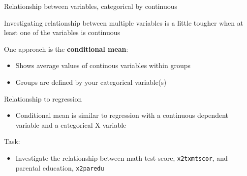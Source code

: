\documentclass[8pt,ignorenonframetext,dvipsnames]{beamer}
\newenvironment{Shaded}{\begin{snugshade}}{\end{snugshade}}
\newcommand{\KeywordTok}[1]{\textcolor[rgb]{0.13,0.29,0.53}{\textbf{#1}}}
\newcommand{\DataTypeTok}[1]{\textcolor[rgb]{0.13,0.29,0.53}{#1}}
\newcommand{\StringTok}[1]{\textcolor[rgb]{0.31,0.60,0.02}{#1}}
\newcommand{\CommentTok}[1]{\textcolor[rgb]{0.56,0.35,0.01}{\textit{#1}}}
\newcommand{\OtherTok}[1]{\textcolor[rgb]{0.56,0.35,0.01}{#1}}
\newcommand{\OperatorTok}[1]{\textcolor[rgb]{0.81,0.36,0.00}{\textbf{#1}}}
\newcommand{\NormalTok}[1]{#1}
\providecommand{\tightlist}{%
  \setlength{\itemsep}{0pt}\setlength{\parskip}{0pt}}
\renewcommand{\textbf}[1]{{\color{darkgray}\bfseries\fontfamily{Montserrat-TOsF}#1}}
\begin{document}
\begin{frame}[fragile]{Relationship between variables, categorical by
continuous}

Investigating relationship between multiple variables is a little
tougher when at least one of the variables is continuous

One approach is the \textbf{conditional mean}:

\begin{itemize}
\tightlist
\item
  Shows average values of continous variables within groups
\item
  Groups are defined by your categorical variable(s)
\end{itemize}

Relationship to regression

\begin{itemize}
\tightlist
\item
  Conditional mean is similar to regression with a continuous dependent
  variable and a categorical X variable
\end{itemize}

Task:

\begin{itemize}
\tightlist
\item
  Investigate the relationship between math test score,
  \texttt{x2txmtscor}, and parental education, \texttt{x2paredu}
\end{itemize}

\begin{Shaded}
\end{Shaded}

\end{frame}
\end{document}

